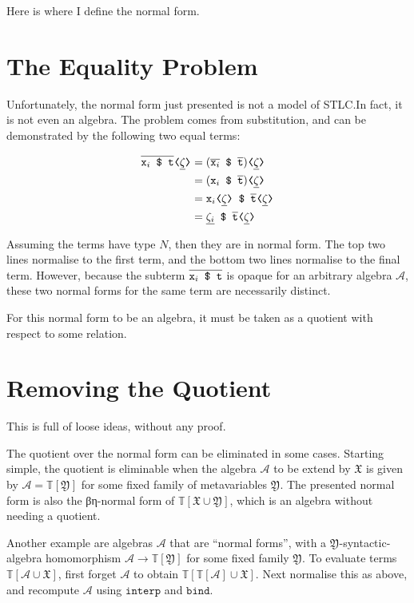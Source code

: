 \documentclass[11pt,a4paper]{article}
\newcommand*\sta[1]{\mathop{\overline{#1}}}
\newcommand*\dyn[1]{\mathop{\underline{#1}}}
\newcommand*\Lapp[2]{\texttt{\ensuremath{#1} \$ \ensuremath{#2}}}
\newcommand*\msub[2]{\texttt{\ensuremath{#1}⟨\ensuremath{#2}⟩}}
\begin{document}
Here is where I define the normal form\footnotemark{}.


\section{The Equality Problem}

Unfortunately, the normal form just presented is not a model of STLC.\@ In fact,
it is not even an algebra. The problem comes from substitution, and can be
demonstrated by the following two equal terms:

\begin{align*}
\msub{\sta{\Lapp{\mathtt{x}_i}{\mathtt{t}}}}{\dyn{\zeta}}
  &= \msub{(\Lapp{\sta{\mathtt{x}_i}}{\sta{\mathtt{t}}})}{\dyn{\zeta}} \\
  &= \msub{(\Lapp{\mathtt{x}_i}{\sta{\mathtt{t}}})}{\dyn{\zeta}} \\
  &= \Lapp{\msub{\mathtt{x}_i}{\dyn{\zeta}}}{\msub{\sta{\mathtt{t}}}{\dyn{\zeta}}} \\
  &= \Lapp{\dyn{\zeta_i}}{\msub{\sta{\mathtt{t}}}{\dyn{\zeta}}}
\end{align*}

Assuming the terms have type \(N\), then they are in normal form. The top two
lines normalise to the first term, and the bottom two lines normalise to the
final term. However, because the subterm
\(\sta{\Lapp{\mathtt{x}_i}{\mathtt{t}}}\) is opaque for an arbitrary algebra
\(\mathcal{A}\), these two normal forms for the same term are necessarily distinct.

For this normal form to be an algebra, it must be taken as a quotient with
respect to some relation\footnotemark{}.


\section{Removing the Quotient}

This is full of loose ideas, without any proof.

The quotient over the normal form can be eliminated in some cases. Starting
simple, the quotient is eliminable when the algebra \(\mathcal{A}\) to be extend by \(\mathfrak{X}\)
is given by \(\mathcal{A} = {\mathbb{T}[\mathfrak{Y}]}\) for some fixed family of metavariables \(\mathfrak{Y}\). The
presented normal form is also the βη-normal form of \(\mathbb{T}[\mathfrak{X} \cup \mathfrak{Y}]\), which is
an algebra without needing a quotient.

Another example are algebras \(\mathcal{A}\) that are ``normal forms'', with a
\(\mathfrak{Y}\)-syntactic-algebra homomorphism \(\mathcal{A} \to {\mathbb{T}[\mathfrak{Y}]}\) for some fixed family \(\mathfrak{Y}\).
To evaluate terms \(\mathbb{T}[\mathcal{A} \cup \mathfrak{X}]\), first forget \(\mathcal{A}\) to obtain \(\mathbb{T}[{\mathbb{T}[\mathcal{A}]} \cup \mathfrak{X}]\).
Next normalise this as above, and recompute \(\mathcal{A}\) using \(\mathtt{interp}\) and
\(\mathtt{bind}\).
\end{document}
